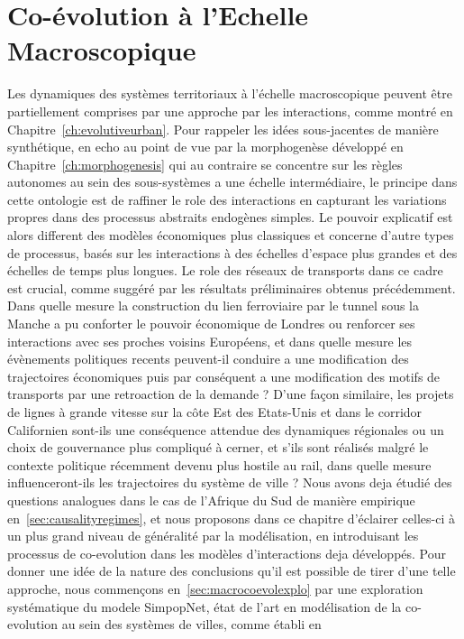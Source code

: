 
\chapter{Co-évolution à l'Echelle Macroscopique}


\label{ch:macrocoevolution} 




Les dynamiques des systèmes territoriaux à l'échelle macroscopique peuvent être partiellement comprises par une approche par les interactions, comme montré en Chapitre~\ref{ch:evolutiveurban}. Pour rappeler les idées sous-jacentes de manière synthétique, en echo au point de vue par la morphogenèse développé en Chapitre~\ref{ch:morphogenesis} qui au contraire se concentre sur les règles autonomes au sein des sous-systèmes a une échelle intermédiaire, le principe dans cette ontologie est de raffiner le role des interactions en capturant les variations propres dans des processus abstraits endogènes simples. Le pouvoir explicatif est alors different des modèles économiques plus classiques et concerne d'autre types de processus, basés sur les interactions à des échelles d'espace plus grandes et des échelles de temps plus longues. Le role des réseaux de transports dans ce cadre est crucial, comme suggéré par les résultats préliminaires obtenus précédemment. Dans quelle mesure la construction du lien ferroviaire par le tunnel sous la Manche a pu conforter le pouvoir économique de Londres ou renforcer ses interactions avec ses proches voisins Européens, et dans quelle mesure les évènements politiques recents peuvent-il conduire a une modification des trajectoires économiques puis par conséquent a une modification des motifs de transports par une retroaction de la demande ? D'une façon similaire, les projets de lignes à grande vitesse sur la côte Est des Etats-Unis et dans le corridor Californien sont-ils une conséquence attendue des dynamiques régionales ou un choix de gouvernance plus compliqué à cerner, et s'ils sont réalisés malgré le contexte politique récemment devenu plus hostile au rail, dans quelle mesure influenceront-ils les trajectoires du système de ville ? Nous avons deja étudié des questions analogues dans le cas de l'Afrique du Sud de manière empirique en~\ref{sec:causalityregimes}, et nous proposons dans ce chapitre d'éclairer celles-ci à un plus grand niveau de généralité par la modélisation, en introduisant les processus de co-evolution dans les modèles d'interactions deja développés. Pour donner une idée de la nature des conclusions qu'il est possible de tirer d'une telle approche, nous commençons en~\ref{sec:macrocoevolexplo} par une exploration systématique du modele SimpopNet, état de l'art en modélisation de la co-evolution au sein des systèmes de villes, comme établi en 